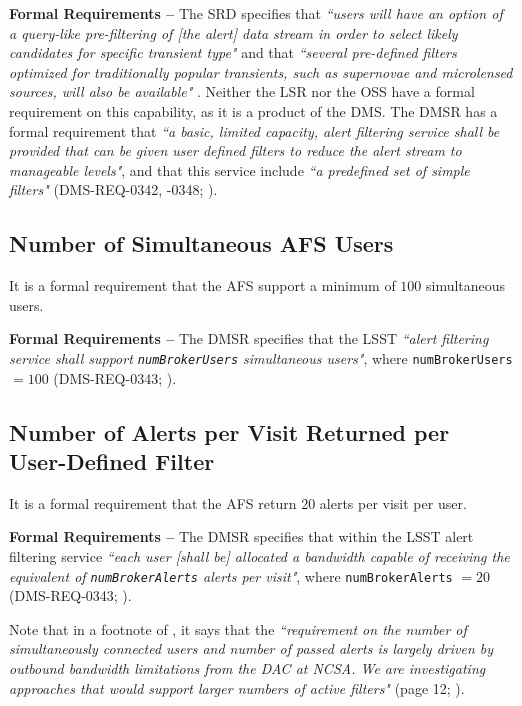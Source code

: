 \documentclass[DM,authoryear,toc]{lsstdoc}
\begin{document}
{\bf Formal Requirements --} The SRD specifies that {\it ``users will have an option of a query-like pre-filtering of [the alert] data stream in order to select likely candidates for specific transient type"} and that {\it ``several pre-defined filters optimized for traditionally popular transients, such as supernovae and microlensed sources, will also be available"} . Neither the LSR nor the OSS have a formal requirement on this capability, as it is a product of the DMS. The DMSR has a formal requirement that {\it ``a basic, limited capacity, alert filtering service shall be provided that can be given user defined filters to reduce the alert stream to manageable levels"}, and that this service include {\it ``a predefined set of simple filters"} (DMS-REQ-0342, -0348; ). 


\subsection{Number of Simultaneous AFS Users}\label{ssec:AFS_users}

It is a formal requirement that the AFS support a minimum of $100$ simultaneous users.

{\bf Formal Requirements --} The DMSR specifies that the LSST {\it ``alert filtering service shall support {\tt numBrokerUsers} simultaneous users"}, where {\tt numBrokerUsers} $=100$ (DMS-REQ-0343; ).


\subsection{Number of Alerts per Visit Returned per User-Defined Filter}\label{ssec:AFS_returns}

It is a formal requirement that the AFS return $20$ alerts per visit per user.

{\bf Formal Requirements --} The DMSR specifies that within the LSST alert filtering service {\it ``each user [shall be] allocated a bandwidth capable of receiving the equivalent of {\tt numBrokerAlerts} alerts per visit"}, where {\tt numBrokerAlerts} $=20$ (DMS-REQ-0343; ).

Note that in a footnote of , it says that the {\it ``requirement on the number of simultaneously connected users and number of passed alerts is largely driven by outbound bandwidth limitations from the DAC at NCSA. We are investigating approaches that would support larger numbers of active filters"} (page 12; ).
\end{document}
